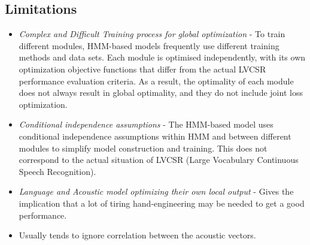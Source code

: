\subsection{Limitations}
\label{sub:limitations-traditional-asr}
\begin{itemize}
    \item \textit{Complex and Difficult Training process for global optimization} - To train different modules, HMM-based models frequently use different training methods and data sets. Each module is optimised independently, with its own optimization objective functions that differ from the actual LVCSR performance evaluation criteria. As a result, the optimality of each module does not always result in global optimality, and they do not include joint loss optimization.
    \item \textit{Conditional independence assumptions} - The HMM-based model uses conditional independence assumptions within HMM and between different modules to simplify model construction and training. This does not correspond to the actual situation of LVCSR (Large Vocabulary Continuous Speech Recognition).
    \item \textit{Language and Acoustic model optimizing their own local output} - Gives the implication that a lot of tiring hand-engineering may be needed to get a good performance.
    \item Usually tends to ignore correlation between the acoustic vectors.
    
\end{itemize}



